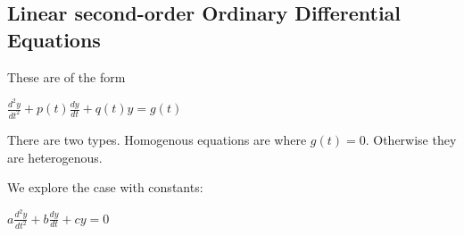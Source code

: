 
\subsection{Linear second-order Ordinary Differential Equations}

These are of the form

\(\frac{d^2y}{dt^2}+p(t)\frac{dy}{dt}+q(t)y=g(t)\)

There are two types. Homogenous equations are where \(g(t)=0\). Otherwise they are heterogenous.

We explore the case with constants:

\(a\frac{d^2y}{dt^2}+b\frac{dy}{dt}+cy=0\)


